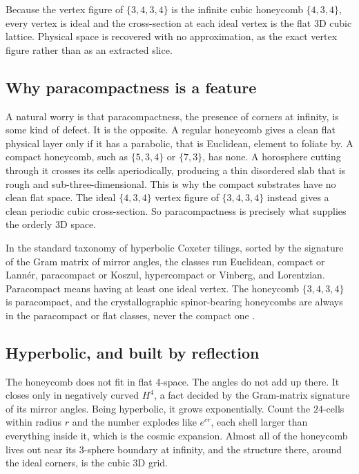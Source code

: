 \begin{result}
Because the vertex figure of $\{3,4,3,4\}$ is the infinite cubic honeycomb $\{4,3,4\}$, every vertex is ideal and the cross-section at each ideal vertex is the flat 3D cubic lattice. Physical space is recovered with no approximation, as the exact vertex figure rather than as an extracted slice.
\end{result}

\subsection{Why paracompactness is a feature}

A natural worry is that paracompactness, the presence of corners at infinity, is some kind of defect. It is the opposite. A regular honeycomb gives a clean flat physical layer only if it has a parabolic, that is Euclidean, element to foliate by. A compact honeycomb, such as $\{5,3,4\}$ or $\{7,3\}$, has none. A horosphere cutting through it crosses its cells aperiodically, producing a thin disordered slab that is rough and sub-three-dimensional. This is why the compact substrates have no clean flat space. The ideal $\{4,3,4\}$ vertex figure of $\{3,4,3,4\}$ instead gives a clean periodic cubic cross-section. So paracompactness is precisely what supplies the orderly 3D space.

In the standard taxonomy of hyperbolic Coxeter tilings, sorted by the signature of the Gram matrix of mirror angles, the classes run Euclidean, compact or Lannér, paracompact or Koszul, hypercompact or Vinberg, and Lorentzian. Paracompact means having at least one ideal vertex. The honeycomb $\{3,4,3,4\}$ is paracompact, and the crystallographic spinor-bearing honeycombs are always in the paracompact or flat classes, never the compact one \cite{margenstern2013}.

\subsection{Hyperbolic, and built by reflection}

The honeycomb does not fit in flat 4-space. The angles do not add up there. It closes only in negatively curved $H^4$, a fact decided by the Gram-matrix signature of its mirror angles. Being hyperbolic, it grows exponentially. Count the $24$-cells within radius $r$ and the number explodes like $e^{cr}$, each shell larger than everything inside it, which is the cosmic expansion. Almost all of the honeycomb lives out near its $3$-sphere boundary at infinity, and the structure there, around the ideal corners, is the cubic 3D grid.

